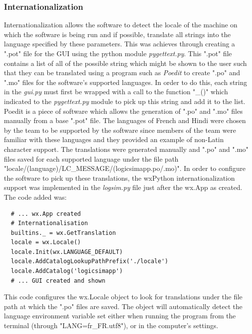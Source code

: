 \documentclass{article}					%
\begin{document}
\subsubsection{Internationalization}
Internationalization allows the software to detect the locale of the machine on which the software is being run and if possible, translate all strings into the language specified by these parameters. This was achieves through creating a ".pot" file for the GUI using the python module \textit{pygettext.py}. This ".pot" file contains a list of all of the possible string which might be shown to the user such that they can be translated using a program such as \textit{Poedit} to create ".po" and ".mo" files for the software's supported languages. In order to do this, each string in the \textit{gui.py} must first be wrapped with a call to the function "\_()" which indicated to the \textit{pygettext.py} module to pick up this string and add it to the list. Poedit is a piece of software which allows the generation of ".po" and ".mo" files manually from a base ".pot" file. The languages of French and Hindi were chosen by the team to be supported by the software since members of the team were familiar with these languages and they provided an example of non-Latin character support. The translations were generated manually and ".po" and ".mo" files saved for each supported language under the file path "locale/(language)/LC\_MESSAGE/(logicsimapp.po/.mo)". In order to configure the software to pick up these translations, the wxPython internationalization support was implemented in the \textit{logsim.py} file just after the wx.App as created. The code added was:
\begin{verbatim}
  # ... wx.App created
  # Internationalisation
  builtins._ = wx.GetTranslation
  locale = wx.Locale()
  locale.Init(wx.LANGUAGE_DEFAULT)
  locale.AddCatalogLookupPathPrefix('./locale')
  locale.AddCatalog('logicsimapp')
  # ... GUI created and shown
\end{verbatim}
This code configures the wx.Locale object to look for translations under the file path at which the ".po" files are saved. The object will automatically detect the language environment variable set either when running the program from the terminal (through "LANG=fr\_FR.utf8"), or in the computer's settings.
\end{document}
